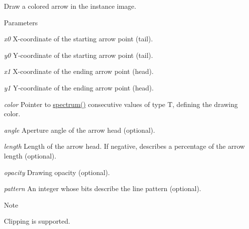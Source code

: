 \label{structcimg__library_1_1CImg_a4955c7a5a132072f634ed9832b783f83}


Draw a colored arrow in the instance image. 


\begin{DoxyParams}{Parameters}
\item[{\em x0}]X-\/coordinate of the starting arrow point (tail). \item[{\em y0}]Y-\/coordinate of the starting arrow point (tail). \item[{\em x1}]X-\/coordinate of the ending arrow point (head). \item[{\em y1}]Y-\/coordinate of the ending arrow point (head). \item[{\em color}]Pointer to {\ttfamily \hyperlink{structcimg__library_1_1CImg_acd2ee207fa512e34b45ff548082f70ba}{spectrum()}} consecutive values of type {\ttfamily T}, defining the drawing color. \item[{\em angle}]Aperture angle of the arrow head (optional). \item[{\em length}]Length of the arrow head. If negative, describes a percentage of the arrow length (optional). \item[{\em opacity}]Drawing opacity (optional). \item[{\em pattern}]An integer whose bits describe the line pattern (optional). \end{DoxyParams}
\begin{DoxyNote}{Note}

\begin{DoxyItemize}
\item Clipping is supported. 
\end{DoxyItemize}
\end{DoxyNote}
